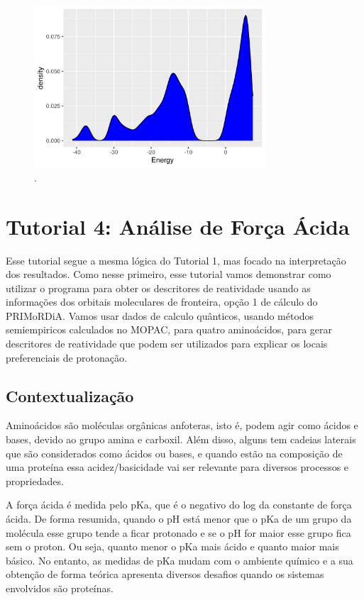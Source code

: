 \documentclass[a4paper,11pt]{refart}
\begin{document}
\hspace*{-\leftmarginwidth}
\begin{minipage}{\fullwidth}
	\begin{figure}[H]
		\begin{center}
			\includegraphics[width=3.4in]{images/tut3_img32}
			\caption{.}
			\label{fig_tut3_31}
		\end{center}
	\end{figure}
\end{minipage}


\newpage
\section{Tutorial 4: Análise de Força Ácida}

Esse tutorial segue a mesma lógica do Tutorial 1, mas focado na interpretação dos resultados. Como nesse primeiro, esse tutorial vamos demonstrar como utilizar o programa para obter os descritores de reatividade usando as informações dos orbitais moleculares de fronteira, opção 1 de cálculo do PRIMoRDiA. Vamos usar dados de calculo quânticos, usando métodos semiempiricos calculados no MOPAC, para quatro aminoácidos, para gerar descritores de reatividade que podem ser utilizados para explicar os locais preferenciais de protonação.

\subsection{Contextualização}

Aminoácidos são moléculas orgânicas anfoteras, isto é, podem agir como ácidos e bases, devido ao grupo amina e carboxil. Além disso, alguns tem cadeias laterais que são considerados como ácidos ou bases, e quando estão na composição de uma proteína essa acidez/basicidade vai ser relevante para diversos processos e propriedades.

A força ácida é medida pelo pKa, que é o negativo do log da constante de força ácida. De forma resumida, quando o pH está menor que o pKa de um grupo da molécula esse grupo tende a ficar protonado e se o pH for maior esse grupo fica sem o proton. Ou seja, quanto menor o pKa mais ácido e quanto maior mais básico. No entanto, as medidas de pKa mudam com o ambiente químico e a sua obtenção de forma teórica apresenta diversos desafios quando os sistemas envolvidos são proteínas.
\end{document}

